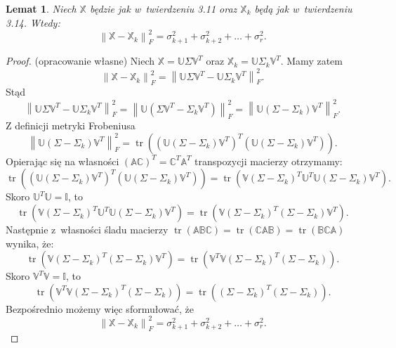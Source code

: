 \documentclass[12pt,a4paper]{report}
\newtheorem{lemat}[df]{Lemat}
\newcommand{\norma}[1]{\left\| {#1} \right\|}
\newcommand{\tr}[1]{\operatorname{tr}\left({#1} \right)}
\begin{document}
\begin{lemat}
Niech $\mathbb{X}$ będzie jak w~twierdzeniu 3.11 oraz $\mathbb{X}_k$ będą jak w~twierdzeniu 3.14.
Wtedy:
$$
\norma{ \mathbb{X} - \mathbb{X}_k}_F^2 = \sigma_{k+1}^2 + \sigma_{k+2}^2 + \ldots + \sigma_{r}^2.
$$
\end{lemat}
\begin{proof}(opracowanie własne)
Niech $\mathbb{X}=\mathbb{U} \Sigma \mathbb{V}^T$ oraz $\mathbb{X}_k=\mathbb{U} \Sigma_k \mathbb{V}^T$.
Mamy zatem
$$
\norma{ \mathbb{X} - \mathbb{X}_k}_F^2 =
\norma{\mathbb{U} \Sigma \mathbb{V}^T - \mathbb{U} \Sigma_k \mathbb{V}^T}_F^2.
$$
Stąd
$$
\norma{\mathbb{U} \Sigma \mathbb{V}^T - \mathbb{U} \Sigma_k \mathbb{V}^T}_F^2 = 
\norma{\mathbb{U} (\Sigma \mathbb{V}^T - \Sigma_k \mathbb{V}^T)}_F^2 = 
\norma{\mathbb{U} (\Sigma - \Sigma_k) \mathbb{V}^T}_F^2.
$$
Z definicji metryki Frobeniusa
$$
\norma{\mathbb{U} (\Sigma - \Sigma_k) \mathbb{V}^T}_F^2 = 
\tr{(\mathbb{U} (\Sigma - \Sigma_k) \mathbb{V}^T)^T (\mathbb{U} (\Sigma - \Sigma_k) \mathbb{V}^T)}.
$$
Opierając się na własności $(\mathbb{A}\mathbb{C})^T = \mathbb{C}^T \mathbb{A}^T$ transpozycji macierzy otrzymamy:
$$
\tr{(\mathbb{U} (\Sigma - \Sigma_k) \mathbb{V}^T)^T (\mathbb{U} (\Sigma - \Sigma_k) \mathbb{V}^T)} = \tr{\mathbb{V} (\Sigma - \Sigma_k)^T \mathbb{U}^T \mathbb{U} (\Sigma - \Sigma_k) \mathbb{V}^T}.
$$
Skoro $\mathbb{U}^T \mathbb{U} = \mathbb{I}$, to
$$
\tr{\mathbb{V} (\Sigma - \Sigma_k)^T \mathbb{U}^T \mathbb{U} (\Sigma - \Sigma_k) \mathbb{V}^T} = 
\tr{\mathbb{V} (\Sigma - \Sigma_k)^T (\Sigma - \Sigma_k) \mathbb{V}^T}.
$$
Następnie z~własności śladu macierzy $\tr{\mathbb{A} \mathbb{B} \mathbb{C}}  = \tr{\mathbb{C} \mathbb{A} \mathbb{B}} = \tr{\mathbb{B} \mathbb{C} \mathbb{A}}$ wynika, że:
$$
\tr{\mathbb{V} (\Sigma - \Sigma_k)^T (\Sigma - \Sigma_k) \mathbb{V}^T} = \tr{\mathbb{V}^T \mathbb{V} (\Sigma - \Sigma_k)^T (\Sigma - \Sigma_k)}.
$$ 
Skoro $\mathbb{V}^T \mathbb{V} = \mathbb{I}$, to
$$
\tr{\mathbb{V}^T \mathbb{V} (\Sigma - \Sigma_k)^T (\Sigma - \Sigma_k)} = \tr{(\Sigma - \Sigma_k)^T (\Sigma - \Sigma_k) }.
$$
Bezpośrednio możemy więc sformułować, że
$$
\norma{ \mathbb{X} - \mathbb{X}_k}_F^2 = \sigma_{k+1}^2 + \sigma_{k+2}^2 + \ldots + \sigma_{r}^2.
$$
\end{proof}
\end{document}
